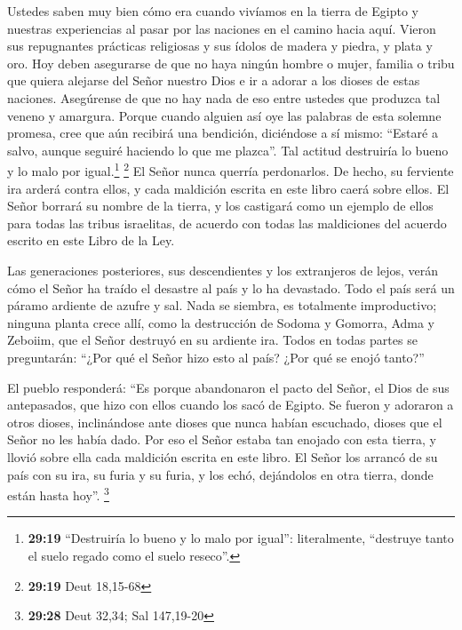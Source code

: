  Ustedes saben muy bien cómo era cuando vivíamos en la
tierra de Egipto y nuestras experiencias al pasar por las naciones en el
camino hacia aquí.  Vieron sus repugnantes prácticas
religiosas y sus ídolos de madera y piedra, y plata y oro.
 Hoy deben asegurarse de que no haya ningún hombre o
mujer, familia o tribu que quiera alejarse del Señor nuestro Dios e ir a
adorar a los dioses de estas naciones. Asegúrense de que no hay nada de
eso entre ustedes que produzca tal veneno y amargura. 
Porque cuando alguien así oye las palabras de esta solemne promesa, cree
que aún recibirá una bendición, diciéndose a sí mismo: ``Estaré a salvo,
aunque seguiré haciendo lo que me plazca''. Tal actitud destruiría lo
bueno y lo malo por igual.\footnote{\textbf{29:19} ``Destruiría lo bueno
  y lo malo por igual'': literalmente, ``destruye tanto el suelo regado
  como el suelo reseco''.} \footnote{\textbf{29:19} Deut 18,15-68}
 El Señor nunca querría perdonarlos. De hecho, su
ferviente ira arderá contra ellos, y cada maldición escrita en este
libro caerá sobre ellos. El Señor borrará su nombre de la tierra,
 y los castigará como un ejemplo de ellos para todas las
tribus israelitas, de acuerdo con todas las maldiciones del acuerdo
escrito en este Libro de la Ley.

 Las generaciones posteriores, sus descendientes y los
extranjeros de lejos, verán cómo el Señor ha traído el desastre al país
y lo ha devastado.  Todo el país será un páramo ardiente
de azufre y sal. Nada se siembra, es totalmente improductivo; ninguna
planta crece allí, como la destrucción de Sodoma y Gomorra, Adma y
Zeboiim, que el Señor destruyó en su ardiente ira.  Todos
en todas partes se preguntarán: ``¿Por qué el Señor hizo esto al país?
¿Por qué se enojó tanto?''

 El pueblo responderá: ``Es porque abandonaron el pacto
del Señor, el Dios de sus antepasados, que hizo con ellos cuando los
sacó de Egipto.  Se fueron y adoraron a otros dioses,
inclinándose ante dioses que nunca habían escuchado, dioses que el Señor
no les había dado.  Por eso el Señor estaba tan enojado
con esta tierra, y llovió sobre ella cada maldición escrita en este
libro.  El Señor los arrancó de su país con su ira, su
furia y su furia, y los echó, dejándolos en otra tierra, donde están
hasta hoy''. \footnote{\textbf{29:28} Deut 32,34; Sal 147,19-20}

